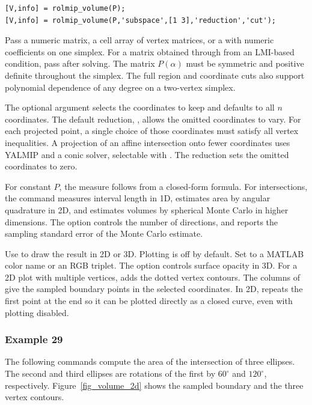 \documentclass[english,11pt]{article}
\theoremstyle{break} \theorembodyfont{\small\rm}
\begin{document}
\begin{lstlisting}[style=ManualCode]
[V,info] = rolmip_volume(P);
[V,info] = rolmip_volume(P,'subspace',[1 3],'reduction','cut');
\end{lstlisting}

Pass a numeric matrix, a cell array of vertex matrices, or a
 with numeric coefficients on one simplex.
For a matrix obtained through from an LMI-based condition, pass  after solving.
The matrix $P(\alpha)$ must be symmetric and positive definite
throughout the simplex. The full region and coordinate cuts also
support polynomial dependence of any degree on a two-vertex simplex.

The optional argument  selects the coordinates to keep
and defaults to all $n$ coordinates. The default reduction,
, allows the omitted coordinates to vary. For each
projected point, a single choice of those coordinates must satisfy all
vertex inequalities. A projection of an affine intersection onto fewer
coordinates uses YALMIP and a conic solver, selectable with
. The  reduction sets the omitted
coordinates to zero.

For constant $P$, the measure follows from a closed-form formula.
For intersections, the command measures interval length in 1D,
estimates area by angular quadrature in 2D, and estimates volumes by
spherical Monte Carlo in higher dimensions. The option
 controls the number of
directions, and  reports the sampling standard
error of the Monte Carlo estimate.

Use  to draw the result in 2D or 3D. Plotting is off
by default. Set  to a MATLAB color name or an RGB triplet.
The option  controls surface opacity in 3D.
For a 2D plot with multiple vertices,  adds the
dotted vertex contours. The columns of  give the
sampled boundary points in the selected coordinates. In 2D,
 repeats the first point at the end so it can be
plotted directly as a closed curve, even with plotting disabled.

\pagebreak
\subsubsection*{Example 29}
The following commands compute the area of the intersection of three
ellipses. The second and third ellipses are rotations of the first by
$60^\circ$ and $120^\circ$, respectively. Figure~\ref{fig_volume_2d}
shows the sampled boundary and the three vertex contours.
\end{document}
